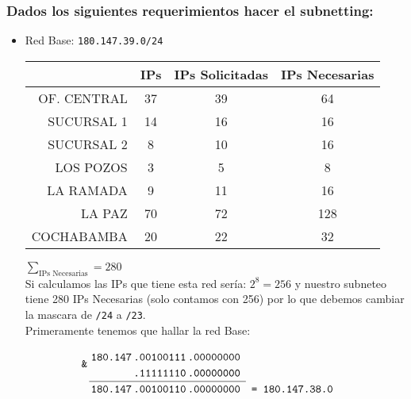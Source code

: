 \subsubsection*{Dados los siguientes requerimientos hacer el subnetting:}

\begin{itemize}
\item Red Base: \texttt{180.147.39.0/24}

\begin{table}[ht]
\centering
    \begin{tabular}{|r|c|c|c|}
        \hline
        ~           & IPs & IPs Solicitadas & IPs Necesarias \\ \hline
        OF. CENTRAL & 37  & 39              & 64             \\ 
        SUCURSAL 1  & 14  & 16              & 16             \\ 
        SUCURSAL 2  & 8   & 10              & 16             \\ 
        LOS POZOS   & 3   & 5               & 8              \\ 
        LA RAMADA   & 9   & 11              & 16             \\ 
        LA PAZ      & 70  & 72              & 128            \\ 
        COCHABAMBA  & 20  & 22              & 32             \\
        \hline
    \end{tabular}
\end{table}
$\sum_{\text{IPs Necesarias}}=280$ \\
Si calculamos las IPs que tiene esta red sería: $2^8=256$ y nuestro subneteo tiene 280 IPs Necesarias (solo contamos con 256) por lo que debemos cambiar la mascara de \texttt{/24} a \texttt{/23}.
\\ ${ }$ \\
Primeramente tenemos que hallar la red Base:

\[
\renewcommand\arraystretch{1.2}
\begin{array}{c@{}c@{\,}c@{\,}c@{\,}c@{\,}ccl}
& \makebox[0pt]{\raisebox{-.5\normalbaselineskip}[0pt][0pt]{\texttt{\& }}} & & \texttt{180.147} & \texttt{.00100111} & \texttt{.00000000}\\
& & &  & \texttt{.11111110} & \texttt{.00000000} \\
\cline{3-6}
& & & \texttt{180.147} & \texttt{.00100110}  & \texttt{.00000000} &  \texttt{= 180.147.38.0} &  \\


\end{array}\]
\end{itemize}
